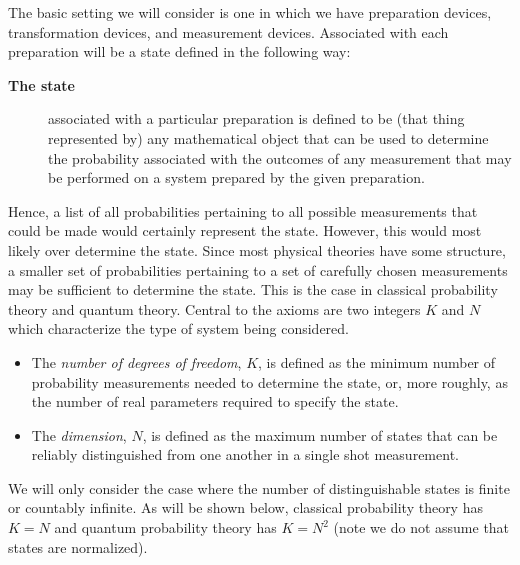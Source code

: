 \documentclass[10pt,twocolumn]{article}
\begin{document}
The basic setting we will consider is one in which we have preparation
devices, transformation devices, and measurement devices. Associated
with each preparation will be a state defined in the following way:
\begin{description}
\item[\bf The state] associated with a particular preparation is
defined to be (that thing represented by) any mathematical object that
can be used to determine the
probability associated with the outcomes of any measurement that may be
performed on a system prepared by the given preparation.
\end{description}
Hence, a list of all probabilities pertaining to all possible measurements that
could be made would certainly represent the state.  However, this would
most likely over determine the state.  Since most physical theories have
some structure, a smaller set of probabilities
pertaining to a set of carefully chosen measurements may be
sufficient to determine the state.  This is the case in
classical probability theory and quantum theory.
Central to the axioms are two integers $K$ and $N$ which
characterize the type of system being considered.
\begin{itemize}
\item The {\it number of degrees of freedom}, $K$, is defined as the
minimum number of probability measurements needed to determine the
state, or, more
roughly, as the number of real parameters required to specify the state.
\item The {\it dimension}, $N$, is defined as the
maximum number of states that can be reliably distinguished from one
another in a single shot measurement.
\end{itemize}
We will only consider the case where the number of distinguishable
states is finite or countably infinite.
As will be shown below, classical probability theory has $K=N$ and quantum
probability theory has $K=N^2$ (note we do not assume that states
are normalized).
\end{document}
